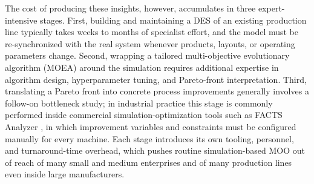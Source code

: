 \documentclass[a4paper,fleqn]{cas-sc}
\begin{document}

The cost of producing these insights, however, accumulates in three expert-intensive stages. First, building and maintaining a DES of an existing production line typically takes weeks to months of specialist effort, and the model must be re-synchronized with the real system whenever products, layouts, or operating parameters change. Second, wrapping a tailored multi-objective evolutionary algorithm (MOEA) around the simulation requires additional expertise in algorithm design, hyperparameter tuning, and Pareto-front interpretation. Third, translating a Pareto front into concrete process improvements generally involves a follow-on bottleneck study; in industrial practice this stage is commonly performed inside commercial simulation-optimization tools such as FACTS Analyzer \citep{FACTSAnalyzer}, in which improvement variables and constraints must be configured manually for every machine. Each stage introduces its own tooling, personnel, and turnaround-time overhead, which pushes routine simulation-based MOO out of reach of many small and medium enterprises and of many production lines even inside large manufacturers.                                              
\end{document}
